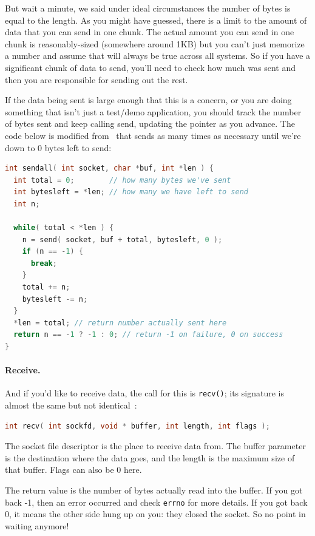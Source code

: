 \documentclass[a4paper]{report}
\begin{document}
But wait a minute, we said under ideal circumstances the number of bytes is equal to the length. As you might have guessed, there is a limit to the amount of data that you can send in one chunk. The actual amount you can send in one chunk is reasonably-sized (somewhere around 1KB) but you can't just memorize a number and assume that will always be true across all systems. So if you have a significant chunk of data to send, you'll need to check how much was sent and then you are responsible for sending out the rest.

If the data being sent is large enough that this is a concern, or you are doing something that isn't just a test/demo application, you should track the number of bytes sent and keep calling send, updating the pointer as you advance. The code below is modified from~\cite{getaddrinfo} that sends as many times as necessary until we're down to 0 bytes left to send:

\begin{lstlisting}[language=C]
int sendall( int socket, char *buf, int *len ) {
  int total = 0;        // how many bytes we've sent
  int bytesleft = *len; // how many we have left to send
  int n;

  while( total < *len ) {
    n = send( socket, buf + total, bytesleft, 0 );
    if (n == -1) { 
      break; 
    }
    total += n;
    bytesleft -= n;
  }
  *len = total; // return number actually sent here
  return n == -1 ? -1 : 0; // return -1 on failure, 0 on success
}
\end{lstlisting}

\paragraph{Receive.} And if you'd like to receive data, the call for this is \texttt{recv()}; its signature is almost the same but not identical~\cite{apunix}:

\begin{lstlisting}[language=C]
int recv( int sockfd, void * buffer, int length, int flags );
\end{lstlisting}

The socket file descriptor is the place to receive data from. The buffer parameter is the destination where the data goes, and the length is the maximum size of that buffer. Flags can also be 0 here.

The return value is the number of bytes actually read into the buffer. If you got back -1, then an error occurred and check \texttt{errno} for more details. If you got back 0, it means the other side hung up on you: they closed the socket. So no point in waiting anymore!
\end{document}
